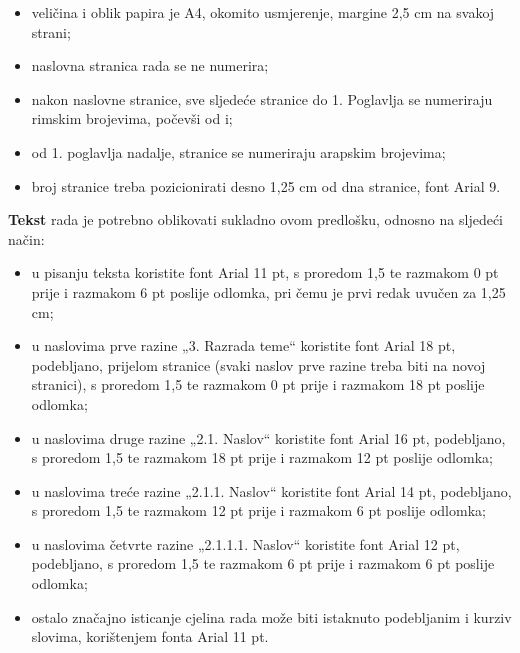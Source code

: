 \begin{itemize}
    \item veličina i oblik papira je A4, okomito usmjerenje, margine 2,5 cm na svakoj strani;

    \item naslovna stranica rada se ne numerira;

    \item nakon naslovne stranice, sve sljedeće stranice do 1. Poglavlja se numeriraju rimskim brojevima, počevši od i;

    \item od 1. poglavlja nadalje, stranice se numeriraju arapskim brojevima;

    \item broj stranice treba pozicionirati desno 1,25 cm od dna stranice, font Arial 9.
\end{itemize}
\begin{flushleft}\textbf{Tekst} rada je potrebno oblikovati sukladno ovom predlošku, odnosno na sljedeći način:\end{flushleft}
\begin{itemize}
    \item u pisanju teksta koristite font Arial 11 pt, s proredom 1,5 te razmakom 0 pt prije i razmakom 6 pt poslije odlomka, pri čemu je prvi redak uvučen za 1,25 cm;

    \item u naslovima prve razine „3. Razrada teme“ koristite font Arial 18 pt, podebljano, prijelom stranice (svaki naslov prve razine treba biti na novoj stranici), s proredom 1,5 te razmakom 0 pt prije i razmakom 18 pt poslije odlomka;

    \item u naslovima druge razine „2.1. Naslov“ koristite font Arial 16 pt, podebljano, s proredom 1,5 te razmakom 18 pt prije i razmakom 12 pt poslije odlomka;

    \item u naslovima treće razine „2.1.1. Naslov“ koristite font Arial 14 pt, podebljano, s proredom 1,5 te razmakom 12 pt prije i razmakom 6 pt poslije odlomka;

    \item u naslovima četvrte razine „2.1.1.1. Naslov“ koristite font Arial 12 pt, podebljano, s proredom 1,5 te razmakom 6 pt prije i razmakom 6 pt poslije odlomka;

    \item ostalo značajno isticanje cjelina rada može biti istaknuto podebljanim i kurziv slovima, korištenjem fonta Arial 11 pt.
\end{itemize}


